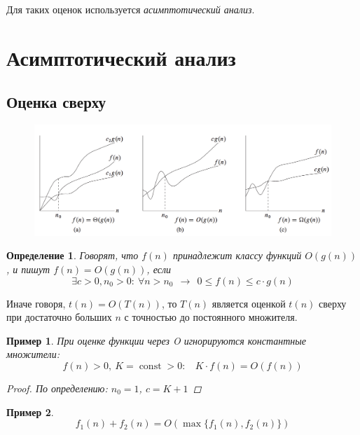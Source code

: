 \documentclass[12pt,a4paper]{report}
\def\const{\mathop{\mathrm{const}}\nolimits}
\newtheorem*{definition}{Определение}
\newtheorem*{example}{Пример}
\begin{document}
Для таких оценок используется {\em асимптотический анализ}.

\section*{Асимптотический анализ}

\subsection*{Оценка сверху}


\begin{figure}[!ht]
\centering
\includegraphics[width=17cm]{classes.png}
\end{figure}

\begin{definition}
Говорят, что $f(n)$ принадлежит классу функций $O(g(n))$, и пишут $f(n)=O(g(n))$, если
$$
\exists c>0, n_0>0:~ \forall n > n_0 ~~\to~~ 0 \leqslant f(n) \leqslant c \cdot g(n)
$$

\end{definition}

Иначе говоря, $t(n)=O(T(n))$, то $T(n)$ является оценкой $t(n)$ сверху при достаточно больших $n$ с точностью до постоянного множителя.



\begin{example}
При оценке функции через O игнорируются константные множители:
$$
f(n) > 0,~ K=\const>0: ~~~~ K \cdot f(n) = O(f(n))
$$
\begin{proof}По определению: $n_0=1$, $c=K+1$\end{proof}
\end{example}


\begin{example}
$$
f_1(n) + f_2(n) = O(\max\{f_1(n), f_2(n)\})
$$
\end{example}
\end{document}
